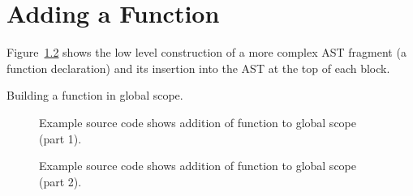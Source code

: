 \chapter{Adding a Function}

   Figure~\ref{Tutorial:exampleAddFunctionDeclaration} shows the low level
construction of a more complex AST fragment (a function declaration) and its insertion 
into the AST at the top of each block.  


   Building a function in global scope.

\begin{figure}[!h]
{\indent
{\mySmallestFontSize


\begin{latexonly}
%  
   
\end{latexonly}

\begin{htmlonly}
   
\end{htmlonly}

}
}
\caption{Example source code shows addition of function to global scope (part 1).}
\label{Tutorial:exampleAddFunctionDeclaration}
\end{figure}

\begin{figure}[!h]
{\indent
{\mySmallestFontSize


\begin{latexonly}
%  
   
\end{latexonly}

\begin{htmlonly}
   
\end{htmlonly}

}
}
\caption{Example source code shows addition of function to global scope (part 2).}
\label{Tutorial:exampleAddFunctionDeclaration}
\end{figure}

